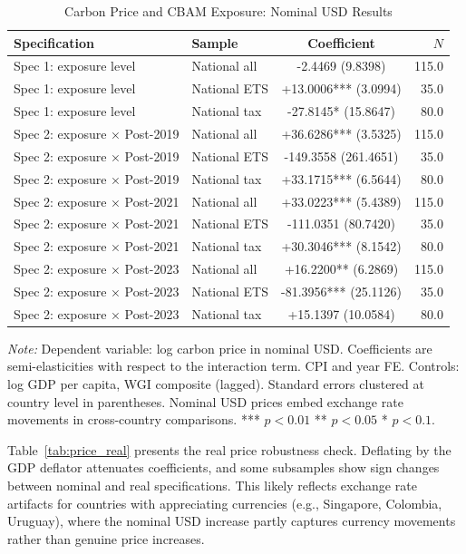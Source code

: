 \documentclass[12pt,a4paper]{article}
\begin{document}
\begin{table}[htbp]
\centering
\begin{threeparttable}
\caption{Carbon Price and CBAM Exposure: Nominal USD Results}\label{tab:price_nominal}
\begin{tabular}{llcr}
\toprule
Specification & Sample & Coefficient & $N$ \\
\midrule
Spec 1: exposure level & National all & -2.4469 (9.8398) & 115.0 \\
Spec 1: exposure level & National ETS & +13.0006*** (3.0994) & 35.0 \\
Spec 1: exposure level & National tax & -27.8145* (15.8647) & 80.0 \\
Spec 2: exposure × Post-2019 & National all & +36.6286*** (3.5325) & 115.0 \\
Spec 2: exposure × Post-2019 & National ETS & -149.3558 (261.4651) & 35.0 \\
Spec 2: exposure × Post-2019 & National tax & +33.1715*** (6.5644) & 80.0 \\
Spec 2: exposure × Post-2021 & National all & +33.0223*** (5.4389) & 115.0 \\
Spec 2: exposure × Post-2021 & National ETS & -111.0351 (80.7420) & 35.0 \\
Spec 2: exposure × Post-2021 & National tax & +30.3046*** (8.1542) & 80.0 \\
Spec 2: exposure × Post-2023 & National all & +16.2200** (6.2869) & 115.0 \\
Spec 2: exposure × Post-2023 & National ETS & -81.3956*** (25.1126) & 35.0 \\
Spec 2: exposure × Post-2023 & National tax & +15.1397 (10.0584) & 80.0 \\
\bottomrule
\end{tabular}
\begin{tablenotes}\small
\item \textit{Note:} Dependent variable: log carbon price in nominal USD. Coefficients are semi-elasticities with respect to the interaction term. CPI and year FE. Controls: log GDP per capita, WGI composite (lagged). Standard errors clustered at country level in parentheses. Nominal USD prices embed exchange rate movements in cross-country comparisons. *** $p<0.01$ ** $p<0.05$ * $p<0.1$.
\end{tablenotes}
\end{threeparttable}
\end{table}

Table~\ref{tab:price_real} presents the real price robustness check. Deflating by the GDP deflator attenuates coefficients, and some subsamples show sign changes between nominal and real specifications. This likely reflects exchange rate artifacts for countries with appreciating currencies (e.g., Singapore, Colombia, Uruguay), where the nominal USD increase partly captures currency movements rather than genuine price increases.
\end{document}
